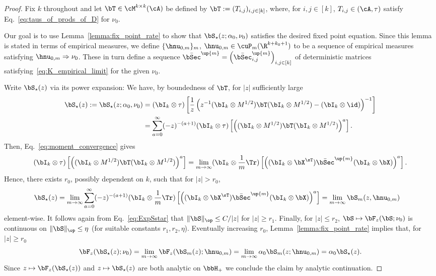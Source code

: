 \begin{proof}
Fix $k$ throughout and let $\bT \in\cM^{k\times k}(\cA)$ be defined by $\bT := ( T_{i,j})_{i,j\in[k]}$,
where, for $i,j\in[k]$, $T_{i,j}\in(\cA,\tau)$ satisfy Eq.~\eqref{eq:taus_of_prods_of_D} for $\nu_0$. 

Our goal is to use Lemma~\ref{lemma:fix_point_rate} to show that $\bS_\star(z;\alpha_0,\nu_0)$ satisfies the desired fixed point equation. Since this lemma is stated in terms of empirical measures, we define 
$\{\hnu_{0,m}\}_m$,
$\hnu_{0,m}\in\cuP_m(\R^{k+k_0+1})$
to be a sequence of empirical measures satisfying $\hnu_{0,m}\Rightarrow \nu_0$.
These in turn define  a sequence $\bar \bSec^\up{m} = \left(\bar \bSec^\up{m}_{i,j}\right)_{i,j \in[k]}$
of deterministic matrices 
satisfying~\eqref{eq:K_empirical_limit} for the given $\nu_0$.

Write $\bS_\star(z)$ via its power expansion:
We have, by boundedness of $\bT$,
for $|z|$ sufficiently large
\begin{align}
\nonumber
\bS_\star(z) :=
\bS_\star(z; \alpha_0,\nu_0)
&= (\bI_k \otimes \tau)\left[ \frac1{z}\left( z^{-1}(\bI_k \otimes M^{1/2})\bT(\bI_k \otimes M^{1/2} )   - (\bI_k \otimes \id) \right)^{-1}\right]
\\
&= \sum_{a=0}^{\infty} (-z)^{-{(a+1)}}(\bI_k \otimes \tau)\left[\left( 
(\bI_k \otimes M^{1/2})\bT (\bI_k \otimes M^{1/2} )
\right)^a\right].\label{eq:ExpSstar}
\end{align}
Then, Eq.~\eqref{eq:moment_convergence} gives
\begin{equation}
\nonumber
    (\bI_k \otimes \tau)\left[\left( 
(\bI_k \otimes M^{1/2})\bT (\bI_k \otimes M^{1/2} )
\right)^a\right] = \lim_{m\to\infty} 
    (\bI_k \otimes \frac1m \Tr)\left[\left( 
(\bI_k \otimes \bX^\sT)\bar\bSec^\up{m} (\bI_k \otimes \bX )
\right)^a\right].
\end{equation}
Hence, there exists $r_0$, possibly dependent on $k$, such that for $|z| > r_0$, 
\begin{align*}
    \bS_\star(z) &= \lim_{m\to\infty}
\sum_{a=0}^{\infty}
    (-z)^{-(a+1)}(\bI_k \otimes \frac1m \Tr)\left[\left( 
(\bI_k \otimes \bX^\sT)\bar\bSec^\up{m} (\bI_k \otimes \bX )
\right)^a\right]
= \lim_{m\to\infty}\bS_m(z, \hnu_{0,m})
\end{align*}
element-wise.
It follows again from  Eq.~\eqref{eq:ExpSstar}
that $\|\bS\|_{\op}\le C/|z|$ for $|z|\ge r_1$.
Finally, for $|z|\le r_2$,
$\bS\mapsto \bF_z(\bS;\nu_0)$ is continuous 
on $\|\bS\|_{\op}\le \eta$ 
(for suitable constants $r_1,r_2,\eta$). 
Eventually increasing $r_0$,
Lemma~\ref{lemma:fix_point_rate} implies that, for $|z|\ge r_0$
\begin{equation} 
\nonumber
    \bF_z(\bS_\star(z);\nu_0) = \lim_{m\to\infty}  \bF_z(\bS_m(z);\hnu_{0,m})
     =  \lim_{m\to\infty} \alpha_0\bS_m(z; \hnu_{0,m}) = \alpha_0\bS_\star(z).
\end{equation}
Since $z\mapsto \bF_z(\bS_\star(z))$ and $z\mapsto \bS_\star(z)$ are both analytic on $\bbH_+$ 
we conclude the claim by analytic continuation.
\end{proof}

